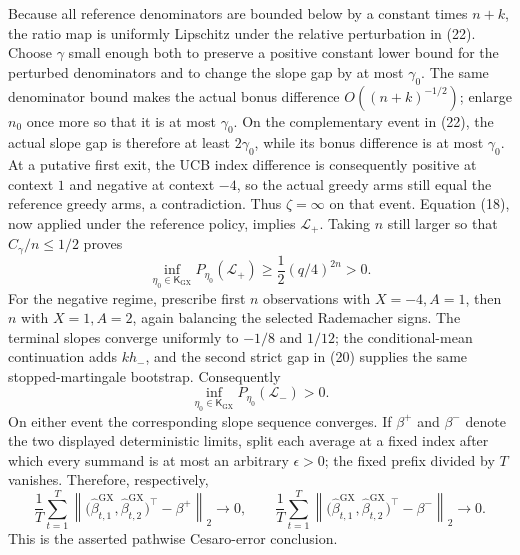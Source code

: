 Because all reference denominators are bounded below by a constant times \(n+k\), the ratio map is uniformly Lipschitz under the relative perturbation in (22). Choose \(\gamma\) small enough both to preserve a positive constant lower bound for the perturbed denominators and to change the slope gap by at most \(\gamma_0\). The same denominator bound makes the actual bonus difference \(O((n+k)^{-1/2})\); enlarge \(n_0\) once more so that it is at most \(\gamma_0\). On the complementary event in (22), the actual slope gap is therefore at least \(2\gamma_0\), while its bonus difference is at most \(\gamma_0\). At a putative first exit, the UCB index difference is consequently positive at context \(1\) and negative at context \(-4\), so the actual greedy arms still equal the reference greedy arms, a contradiction. Thus \(\zeta=\infty\) on that event. Equation (18), now applied under the reference policy, implies \(\mathcal L_+\). Taking \(n\) still larger so that \(C_\gamma/n\leq1/2\) proves
\[
 \inf_{\eta_0\in\mathsf K_{\mathrm{GX}}}P_{\eta_0}(\mathcal L_+)
 \geq \frac12(q/4)^{2n}>0. \tag{23}
\]
For the negative regime, prescribe first \(n\) observations with \(X=-4,A=1\), then \(n\) with \(X=1,A=2\), again balancing the selected Rademacher signs. The terminal slopes converge uniformly to \(-1/8\) and \(1/12\); the conditional-mean continuation adds \(kh_-\), and the second strict gap in (20) supplies the same stopped-martingale bootstrap. Consequently
\[
 \inf_{\eta_0\in\mathsf K_{\mathrm{GX}}}P_{\eta_0}(\mathcal L_-)>0. \tag{24}
\]
On either event the corresponding slope sequence converges. If \(\beta^+\) and \(\beta^-\) denote the two displayed deterministic limits, split each average at a fixed index after which every summand is at most an arbitrary \(\epsilon>0\); the fixed prefix divided by \(T\) vanishes. Therefore, respectively,
\[
 \frac1T\sum_{t=1}^T\left\|\bigl(\widehat\beta^{\mathrm{GX}}_{t,1},\widehat\beta^{\mathrm{GX}}_{t,2}\bigr)^\top-\beta^+\right\|_2\longrightarrow0,
 \qquad
 \frac1T\sum_{t=1}^T\left\|\bigl(\widehat\beta^{\mathrm{GX}}_{t,1},\widehat\beta^{\mathrm{GX}}_{t,2}\bigr)^\top-\beta^-\right\|_2\longrightarrow0.
\]
This is the asserted pathwise Cesaro-error conclusion.

